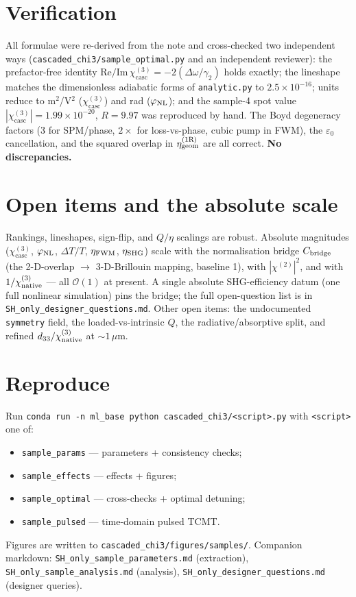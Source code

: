 \documentclass[11pt,a4paper]{article}
\newcommand{\eps}{\varepsilon}
\newcommand{\chitwo}{\chi^{(2)}}
\newcommand{\chithree}{\chi^{(3)}}
\newcommand{\Dom}{\Delta\omega}
\newcommand{\geom}{{\rm geom}}
\newcommand{\chicasc}{\chithree_{\text{casc}}}
\newcommand{\etag}{\eta_{\geom}^{(1\mathrm R)}}
\begin{document}
\section{Verification}
\label{sec:verify}

All formulae were re-derived from the note and cross-checked two independent ways
(\texttt{cascaded\_chi3/sample\_optimal.py} and an independent reviewer): the
prefactor-free identity $\mathrm{Re}/\mathrm{Im}\,\chicasc=-2(\Dom/\gamma_2)$ holds
exactly; the lineshape matches the dimensionless adiabatic forms of
\texttt{analytic.py} to $2.5\times10^{-16}$; units reduce to m$^2$/V$^2$
($\chicasc$) and rad ($\varphi_{\rm NL}$); and the sample-4 spot value
$|\chicasc|=1.99\times10^{-20}$, $R=9.97$ was reproduced by hand. The Boyd
degeneracy factors (3 for SPM/phase, $2\times$ for loss-vs-phase, cubic pump in
FWM), the $\eps_0$ cancellation, and the squared overlap in $\etag$ are all
correct. \textbf{No discrepancies.}

\section{Open items and the absolute scale}
\label{sec:open}

Rankings, lineshapes, sign-flip, and $Q/\eta$ scalings are robust. Absolute
magnitudes ($\chicasc$, $\varphi_{\rm NL}$, $\Delta T/T$, $\eta_{\rm FWM}$,
$\eta_{\rm SHG}$) scale with the normalisation bridge $C_{\rm bridge}$ (the
2-D-overlap $\to$ 3-D-Brillouin mapping, baseline 1), with $|\chitwo|^2$, and with
$1/\chithree_{\rm native}$ --- all $\mathcal{O}(1)$ at present. A single absolute
SHG-efficiency datum (one full nonlinear simulation) pins the bridge; the full
open-question list is in \texttt{SH\_only\_designer\_questions.md}. Other open items: the undocumented
\texttt{symmetry} field, the loaded-vs-intrinsic $Q$, the radiative/absorptive
split, and refined $d_{33}/\chithree_{\rm native}$ at $\sim\!1\,\mu$m.

\section{Reproduce}
\label{sec:code}

Run \texttt{conda run -n ml\_base python cascaded\_chi3/<script>.py} with
\texttt{<script>} one of:
\begin{itemize}[nosep]
  \item \texttt{sample\_params} --- parameters + consistency checks;
  \item \texttt{sample\_effects} --- effects + figures;
  \item \texttt{sample\_optimal} --- cross-checks + optimal detuning;
  \item \texttt{sample\_pulsed} --- time-domain pulsed TCMT.
\end{itemize}
Figures are written to \texttt{cascaded\_chi3/figures/samples/}. Companion
markdown: \texttt{SH\_only\_sample\_parameters.md} (extraction),
\texttt{SH\_only\_sample\_analysis.md} (analysis),
\texttt{SH\_only\_designer\_questions.md} (designer queries).
\end{document}
